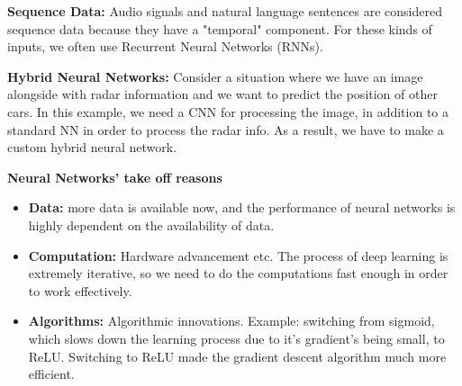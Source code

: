 \textbf{Sequence Data:} Audio signals and natural language sentences are considered sequence data because they have a "temporal" component. For these kinds of inputs, we often use Recurrent Neural Networks (RNNs). 


\textbf{Hybrid Neural Networks:} Consider a situation where we have an image alongside with radar information and we want to predict the position of other cars. In this example, we need a CNN for processing the image, in addition to a standard NN in order to process the radar info. As a result, we have to make a custom hybrid neural network. 

\textbf{Neural Networks' take off reasons}
\begin{itemize}
	\item \textbf{Data:} more data is available now, and the performance of neural networks is highly dependent on the availability of data. 
	\item \textbf{Computation:} Hardware advancement etc. The process of deep learning is extremely iterative, so we need to do the computations fast enough in order to work effectively. 
	\item \textbf{Algorithms:} Algorithmic innovations. Example: switching from sigmoid, which slows down the learning process due to it's gradient's being small, to ReLU. Switching to ReLU made the gradient descent algorithm much more efficient. 
\end{itemize}
